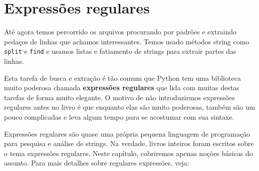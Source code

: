 
\chapter{Expressões regulares}

Até agora temos percorrido os arquivos procurando por padrões e extraindo pedaços de linhas
que achamos interessantes. Temos usado métodos string como {\tt split} e {\tt find} e usamos
listas e fatiamento de strings para extrair partes das linhas.


Esta tarefa de busca e extração é tão comum que Python tem uma biblioteca muito poderosa
chamada {\bf expressões regulares} que lida com muitas destas tarefas de forma muito elegante.
O motivo de não introduzirmos expressões regulares antes no livro é que enquanto elas são muito 
poderosas, também são um pouco complicadas e leva algum tempo para se acostumar com sua sintaxe.

Expressões regulares são quase uma própria pequena linguagem de programação para pesquisa e 
análise de strings. Na verdade, livros inteiros foram escritos sobre o tema expressões regulares. 
Neste capítulo, cobriremos apenas noções básicas do assunto. 
Para mais detalhes sobre regulares expressões, veja:



